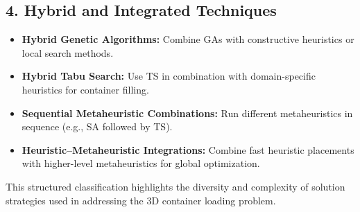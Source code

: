 \subsection*{4. Hybrid and Integrated Techniques}
\begin{itemize}
    \item \textbf{Hybrid Genetic Algorithms:} Combine GAs with constructive heuristics or local search methods.
    \item \textbf{Hybrid Tabu Search:} Use TS in combination with domain-specific heuristics for container filling.
    \item \textbf{Sequential Metaheuristic Combinations:} Run different metaheuristics in sequence (e.g., SA followed by TS).
    \item \textbf{Heuristic–Metaheuristic Integrations:} Combine fast heuristic placements with higher-level metaheuristics for global optimization.
\end{itemize}

This structured classification highlights the diversity and complexity of solution strategies used in addressing the 3D container loading problem.
